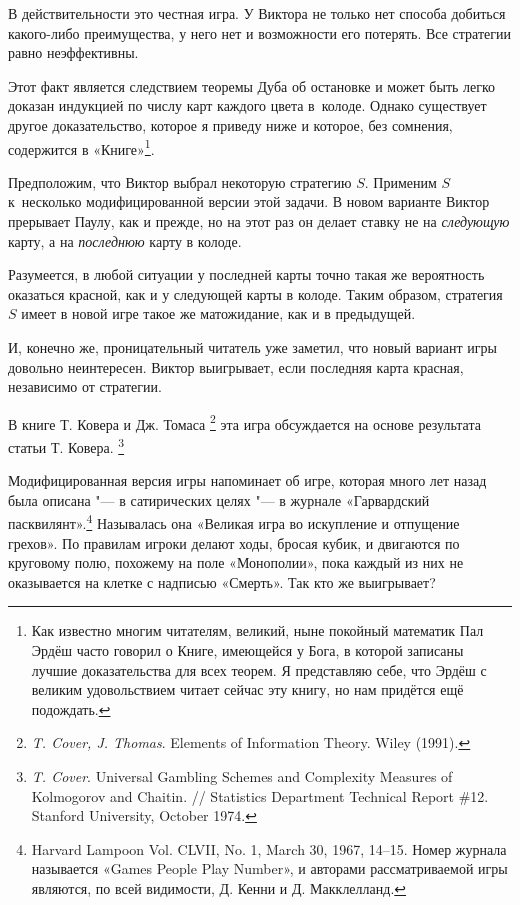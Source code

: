 \documentclass[twoside]{book}
\begin{document}
В действительности это честная игра.
У Виктора не только нет способа добиться какого-либо преимущества, у него нет и возможности его потерять.
Все стратегии равно неэффективны.

Этот факт является следствием теоремы Дуба об остановке %
и может быть легко доказан индукцией по числу карт каждого цвета в~колоде.
Однако существует другое доказательство, которое я приведу ниже и которое, без сомнения, содержится в «Книге»\footnote{Как известно многим читателям, великий, ныне покойный математик Пал Эрдёш часто говорил о Книге, имеющейся у Бога, в которой записаны лучшие доказательства для всех теорем.
Я представляю себе, что Эрдёш с великим удовольствием читает сейчас эту книгу, но нам придётся ещё подождать.}.

Предположим, что Виктор выбрал некоторую стратегию $S$.
Применим $S$ к~несколько модифицированной версии этой задачи.
В новом варианте Виктор прерывает Паулу, как и прежде, но на этот раз он делает ставку не на \emph{следующую} карту, а на \emph{последнюю} карту в колоде.

Разумеется, в любой ситуации у последней карты точно такая же вероятность оказаться красной, как и у следующей карты в колоде.
Таким образом, стратегия $S$ имеет в новой игре такое же матожидание, как и в предыдущей.

И, конечно же, проницательный читатель уже заметил, что новый вариант игры довольно неинтересен.
Виктор выигрывает, если последняя карта красная, независимо от стратегии.
\heart

В книге Т. Ковера и Дж. Томаса%
\footnote{\emph{T. Cover, J. Thomas}. {Elements of Information Theory}. Wiley (1991).} 
эта игра обсуждается на основе результата статьи Т. Ковера.%
\footnote{\emph{T. Cover}. Universal Gambling Schemes and Complexity Measures of Kolmogorov and Chaitin. /\!/ {Statistics Department Technical Report \#12}. Stanford University, October 1974.}

Модифицированная версия игры %
напоминает об игре, которая много лет назад была описана "--- в сатирических целях "--- в журнале «Гарвардский пасквилянт».\footnote{Harvard Lampoon Vol. CLVII, No. 1, March 30, 1967, 14--15.
Номер журнала называется «Games People Play Number», и авторами рассматриваемой игры являются, по всей видимости, Д. Кенни и Д. Макклелланд.%
}
Называлась она «Великая игра во искупление и отпущение грехов».
По правилам игроки делают ходы, бросая кубик, и двигаются по круговому полю, похожему на поле «Монополии», пока каждый из них не оказывается на клетке с надписью «Смерть».
Так кто же выигрывает?
\end{document}
